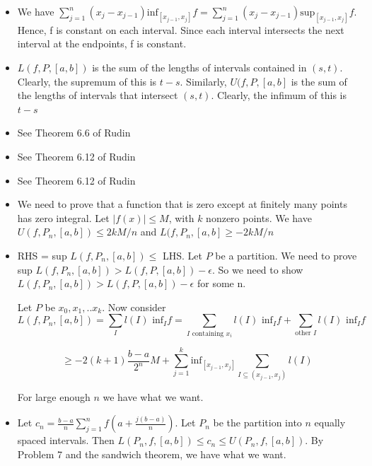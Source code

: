 \documentclass{article}
\begin{document}
\begin{itemize}
    \item [1] We have $\sum_{j=1}^n(x_j-x_{j-1})\text{inf}_{[x_{j-1},x_j]}f=\sum_{j=1}^n(x_j-x_{j-1})\text{sup}_{[x_{j-1},x_j]}f$. Hence, f is constant on each interval. Since each interval intersects the next interval at the endpoints, f is constant.
    \item [2]
    $L(f,P,[a,b])$ is the sum of the lengths of intervals contained in $(s,t)$. Clearly, the supremum of this is $t-s$. Similarly, $U(f,P,[a,b]$ is the sum of the lengths of intervals that intersect $(s,t)$. Clearly, the infimum of this is $t-s$
    \item [3] See Theorem 6.6 of Rudin
    \item [4] See Theorem 6.12 of Rudin
    \item [5] See Theorem 6.12 of Rudin
    \item [6]
    We need to prove that a function that is zero except at finitely many points has zero integral. Let $|f(x)|\leq M$, with $k$ nonzero points. We have $U(f,P_n,[a,b])\leq 2kM/n$ and $L(f,P_n,[a,b] \geq -2kM/n$
    
    \item [7]
    RHS = sup $L(f,P_n,[a,b]) \leq $ LHS. Let $P$ be a partition. We need to prove sup $L(f,P_n,[a,b]) > L(f,P,[a,b])-\epsilon$. So we need to show $L(f,P_n,[a,b]) > L(f,P,[a,b])-\epsilon$ for some n.

    Let $P$ be $x_0,x_1,..x_k$. Now consider 
    \[L(f,P_n,[a,b])=\sum_{I}l(I)\text{ inf}_{I}f=\sum_{I \text{ containing }x_i}l(I)\text{ inf}_{I}f+\sum_{\text{other }I}l(I)\text{ inf}_{I}f\]
    
    \[\geq-2(k+1)\frac{b-a}{2^n}M+
    \sum_{j=1}^k \text{inf}_{[x_{j-1},x_j]}\sum_{I \subseteq(x_{j-1},x_j)} l(I)\]

    For large enough $n$ we have what we want.

    \item[8] Let $c_n=\frac{b-a}{n}\sum_{j=1}^nf(a+\frac{j(b-a)}{n})$. Let $P_n$ be the partition into $n$ equally spaced intervals. Then $L(P_n,f,[a,b])\leq c_n\leq U(P_n,f,[a,b])$. By Problem 7 and the sandwich theorem, we have what we want.
    

\end{itemize}
\end{document}
